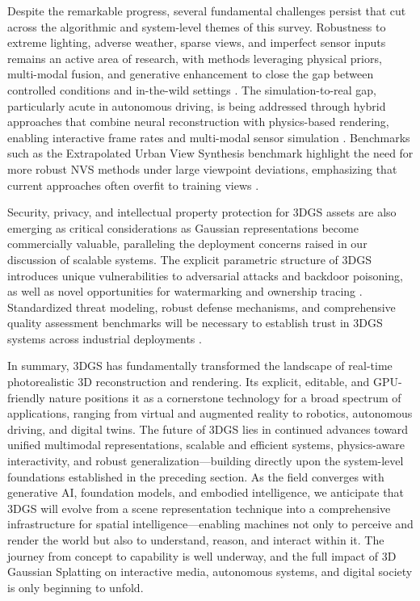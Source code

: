 \documentclass[11pt]{article}
\begin{document}
Despite the remarkable progress, several fundamental challenges persist that cut across the algorithmic and system-level themes of this survey. Robustness to extreme lighting, adverse weather, sparse views, and imperfect sensor inputs remains an active area of research, with methods leveraging physical priors, multi-modal fusion, and generative enhancement to close the gap between controlled conditions and in-the-wild settings \cite{ref801,ref802}. The simulation-to-real gap, particularly acute in autonomous driving, is being addressed through hybrid approaches that combine neural reconstruction with physics-based rendering, enabling interactive frame rates and multi-modal sensor simulation \cite{ref803}. Benchmarks such as the Extrapolated Urban View Synthesis benchmark highlight the need for more robust NVS methods under large viewpoint deviations, emphasizing that current approaches often overfit to training views \cite{ref804}.

Security, privacy, and intellectual property protection for 3DGS assets are also emerging as critical considerations as Gaussian representations become commercially valuable, paralleling the deployment concerns raised in our discussion of scalable systems. The explicit parametric structure of 3DGS introduces unique vulnerabilities to adversarial attacks and backdoor poisoning, as well as novel opportunities for watermarking and ownership tracing \cite{ref791}. Standardized threat modeling, robust defense mechanisms, and comprehensive quality assessment benchmarks will be necessary to establish trust in 3DGS systems across industrial deployments \cite{ref5}.

In summary, 3DGS has fundamentally transformed the landscape of real-time photorealistic 3D reconstruction and rendering. Its explicit, editable, and GPU-friendly nature positions it as a cornerstone technology for a broad spectrum of applications, ranging from virtual and augmented reality to robotics, autonomous driving, and digital twins. The future of 3DGS lies in continued advances toward unified multimodal representations, scalable and efficient systems, physics-aware interactivity, and robust generalization---building directly upon the system-level foundations established in the preceding section. As the field converges with generative AI, foundation models, and embodied intelligence, we anticipate that 3DGS will evolve from a scene representation technique into a comprehensive infrastructure for spatial intelligence---enabling machines not only to perceive and render the world but also to understand, reason, and interact within it. The journey from concept to capability is well underway, and the full impact of 3D Gaussian Splatting on interactive media, autonomous systems, and digital society is only beginning to unfold.
\end{document}
